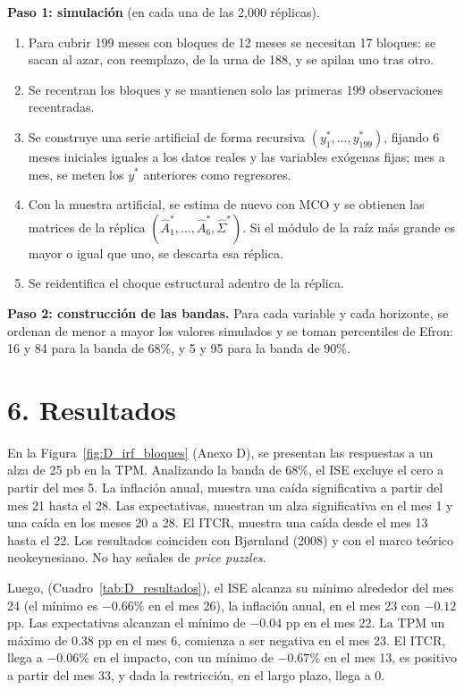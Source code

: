 \documentclass[12pt,letterpaper]{article}
\begin{document}
\textbf{Paso 1: simulación} (en cada una de las 2,000 réplicas).
\begin{enumerate}[label=(\roman*), leftmargin=2.2em, itemsep=1pt, topsep=2pt]
\item Para cubrir 199 meses con bloques de 12 meses se necesitan 17 bloques: se sacan al azar, con reemplazo, de la urna de 188, y se apilan uno tras otro.
\item Se recentran los bloques y se mantienen solo las primeras 199 observaciones recentradas.
\item Se construye una serie artificial de forma recursiva $(y^*_1, \dots, y^*_{199})$, fijando 6 meses iniciales iguales a los datos reales y las variables exógenas fijas; mes a mes, se meten los $y^*$ anteriores como regresores.
\item Con la muestra artificial, se estima de nuevo con MCO y se obtienen las matrices de la réplica $(\hat A^*_1, \dots, \hat A^*_6, \hat\Sigma^*)$. Si el módulo de la raíz más grande es mayor o igual que uno, se descarta esa réplica.
\item Se reidentifica el choque estructural adentro de la réplica.
\end{enumerate}

\textbf{Paso 2: construcción de las bandas.} Para cada variable y cada horizonte, se ordenan de menor a mayor los valores simulados y se toman percentiles de Efron: 16 y 84 para la banda de 68\%, y 5 y 95 para la banda de 90\%.

\section*{6. Resultados}

En la Figura~\ref{fig:D_irf_bloques} (Anexo D), se presentan las respuestas a un alza de 25 pb en la TPM. Analizando la banda de 68\%, el ISE excluye el cero a partir del mes 5. La inflación anual, muestra una caída significativa a partir del mes 21 hasta el 28. Las expectativas, muestran un alza significativa en el mes 1 y una caída en los meses 20 a 28. El ITCR, muestra una caída desde el mes 13 hasta el 22. Los resultados coinciden con Bj{\o}rnland (2008) y con el marco teórico neokeynesiano. No hay señales de \textit{price puzzles}.

Luego, (Cuadro~\ref{tab:D_resultados}), el ISE alcanza su mínimo alrededor del mes 24 (el mínimo es $-0.66$\% en el mes 26), la inflación anual, en el mes 23 con $-0.12$ pp. Las expectativas alcanzan el mínimo de $-0.04$ pp en el mes 22. La TPM un máximo de 0.38 pp en el mes 6, comienza a ser negativa en el mes 23. El ITCR, llega a $-0.06$\% en el impacto, con un mínimo de $-0.67$\% en el mes 13, es positivo a partir del mes 33, y dada la restricción, en el largo plazo, llega a 0.
\end{document}
